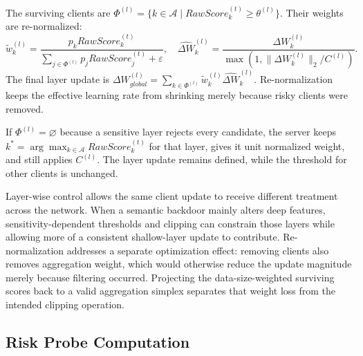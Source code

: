 \documentclass[runningheads,orivec]{llncs}
\begin{document}
The surviving clients are $\Phi^{(l)}=\{k\in\mathcal{A}\mid RawScore_k^{(t)}\ge\theta^{(l)}\}$. Their weights are re-normalized:
\begin{equation}
    \tilde{w}_{k}^{(l)}=\frac{p_kRawScore_k^{(t)}}{\sum_{j\in\Phi^{(l)}}p_jRawScore_j^{(t)}+\varepsilon},\quad
    \widehat{\Delta W}_k^{(l)}=\frac{\Delta W_k^{(l)}}{\max(1,\|\Delta W_k^{(l)}\|_2/C^{(l)})}.
\end{equation}
The final layer update is $\Delta W_{global}^{(l)}=\sum_{k\in\Phi^{(l)}}\tilde{w}_{k}^{(l)}\widehat{\Delta W}_k^{(l)}$. Re-normalization keeps the effective learning rate from shrinking merely because risky clients were removed.

If $\Phi^{(l)}=\varnothing$ because a sensitive layer rejects every candidate, the server keeps $k^*=\arg\max_{k\in\mathcal{A}}RawScore_k^{(t)}$ for that layer, gives it unit normalized weight, and still applies $C^{(l)}$. The layer update remains defined, while the threshold for other clients is unchanged.

Layer-wise control allows the same client update to receive different treatment across the network. When a semantic backdoor mainly alters deep features, sensitivity-dependent thresholds and clipping can constrain those layers while allowing more of a consistent shallow-layer update to contribute. Re-normalization addresses a separate optimization effect: removing clients also removes aggregation weight, which would otherwise reduce the update magnitude merely because filtering occurred. Projecting the data-size-weighted surviving scores back to a valid aggregation simplex separates that weight loss from the intended clipping operation.

\subsection{Risk Probe Computation}
\end{document}
